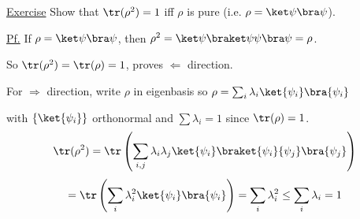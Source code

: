 \documentclass[11pt]{article}
\begin{document}
\underline{Exercise} Show that $\tr(\rho^2) = 1$ iff $\rho$ is pure (i.e. $\rho=\ket\psi\bra\psi$).

\underline{Pf.} If $\rho = \ket\psi\bra\psi$, then $\rho^2 = \ket\psi\braket\psi\psi\bra\psi = \rho$.

So $\tr(\rho^2) = \tr(\rho) = 1$, proves $\Leftarrow$ direction.

For $\Rightarrow$ direction, write $\rho$ in eigenbasis so $\rho = \sum_i \lambda_i\ket{\psi_i}\bra{\psi_i}$

with $\{\ket{\psi_i}\}$ orthonormal and $\sum\lambda_i = 1$ since $\tr(\rho)=1$.
\[
\tr(\rho^2) = \tr\left(\sum_{i,j}\lambda_i\lambda_j\ket{\psi_i}\braket{\psi_i}{\psi_j}\bra{\psi_j}\right)
\]
\[
= \tr\left(\sum_i \lambda_i^2\ket{\psi_i}\bra{\psi_i}\right) = \sum_i\lambda_i^2 \leq \sum_i\lambda_i = 1
\]
\end{document}

